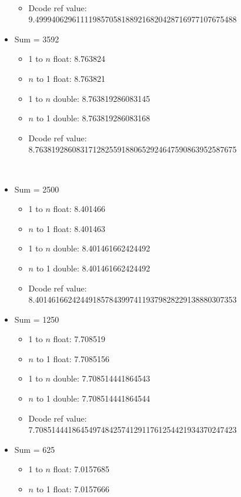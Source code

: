 \documentclass[12pt]{article}
\begin{document}
\begin{itemize}
\begin{itemize}
\\
\item Dcode ref value: 9.4999406296111198570581889216820428716977107675488
\end{itemize}
\item Sum = 3592
\begin{itemize}
\item 1 to $n$ float: 8.763824
\item $n$ to 1 float: 8.763821
\\
\item 1 to $n$ double: 8.763819286083145
\item $n$ to 1 double: 8.763819286083168
\\
\item Dcode ref value: 8.7638192860831712825591880652924647590863952587675
\end{itemize}
\\
\item Sum = 2500
\begin{itemize}
\item 1 to $n$ float: 8.401466
\item $n$ to 1 float: 8.401463
\\
\item 1 to $n$ double: 8.401461662424492
\item $n$ to 1 double: 8.401461662424492
\\
\item Dcode ref value: 8.4014616624244918578439974119379828229138880307353
\end{itemize}
\break
\item Sum = 1250
\begin{itemize}
\item 1 to $n$ float: 7.708519
\item $n$ to 1 float: 7.7085156
\\
\item 1 to $n$ double: 7.708514441864543
\item $n$ to 1 double: 7.708514441864544
\\
\item Dcode ref value: 7.7085144418645497484257412911761254421934370247423
\\
\end{itemize}
\item Sum = 625
\begin{itemize}
\item 1 to $n$ float: 7.0157685
\item $n$ to 1 float: 7.0157666
\\

\end{itemize}
\end{itemize}
\end{document}
